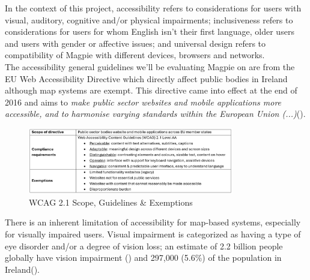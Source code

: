 In the context of this project, accessibility refers to considerations for users with visual, auditory, cognitive and/or physical impairments; inclusiveness refers to considerations for users for whom English isn't their first language, older users and users with gender or affective issues; and universal design refers to compatibility of Magpie with different devices, browsers and networks.\\

\noindent The accessibility general guidelines we'll be evaluating Magpie on are from the EU Web Accessibility Directive which directly affect public bodies in Ireland although map systems are exempt. This directive came into effect at the end of 2016 and aims to \emph{make public sector websites and mobile applications more accessible, and to harmonise varying standards within the European Union (...)}(\cite{webaccessibilitydirective2016}).
\begin{figure}
    \centering
    \includegraphics[width=0.8\textwidth]{images/wcag-guidelines.png}
    \caption{WCAG 2.1 Scope, Guidelines \& Exemptions}
\end{figure}

\noindent There is an inherent limitation of accessibility for map-based systems, especially for visually impaired users. Visual impairment is categorized as having a type of eye disorder and/or a degree of vision loss; an estimate of 2.2 billion people globally have vision impairment (\cite{whoworldreportvision2019}) and 297,000 (5.6\%) of the population in Ireland(\cite{visionirelandcensus}).\\

